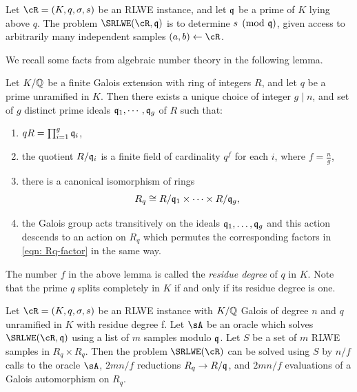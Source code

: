 \documentclass[envcountsect]{llncs}
\begin{document}

\begin{definition} \label{def: srlwe mod q}
        Let $\cR = (K,q,\sigma, s)$ be an RLWE instance, and let $\mathfrak{q}$ be a prime of $K$ lying above $q$.  The problem $\SRLWE(\cR, \fq)$ is to determine $s \pmod {\mathfrak{q}}$, given access to arbitrarily many independent samples $(a,b) \gets \cR$.
\end{definition}

We recall some facts from algebraic number theory in the following lemma.
\begin{lemma}
\label{lem: prime factorization}
Let $K/\mathbb{Q}$ be a finite Galois extension with ring of integers $R$,  and let $q$ be a prime unramified in $K$. Then there exists a unique choice of integer $g \mid n$, and set of $g$ distinct prime ideals $\mathfrak{q}_1, \cdots ,\mathfrak{q}_g$ of
$R$ such that:
\begin{enumerate}
        \item $qR = \prod_{i=1}^g \mathfrak{q}_i$,
        \item the quotient $R/\mathfrak{q}_{i}$ is a finite field of cardinality $q^f$  for each $i$, where $f = \frac{n}{g}$, 
        \item there is a canonical isomorphism of rings
                \begin{equation}
                        \label{eqn: Rq-factor}
    R_q \cong R/\mathfrak{q}_{1} \times \cdots \times R/\mathfrak{q}_{g},
    \end{equation}
\item the Galois group acts transitively on the ideals $\mathfrak{q}_1, \ldots, \mathfrak{q}_g$ and this action descends to an action on $R_q$ which permutes the corresponding factors in \eqref{eqn: Rq-factor} in the same way.
\end{enumerate}
\end{lemma}
The number $f$ in the above lemma is called the {\it residue degree} of $q$ in $K$. Note that the prime $q$ splits completely in $K$ if and only if its residue degree is one.


\begin{theorem} \label{thm: reduction}
        Let $\cR = (K,q,\sigma, s)$ be an RLWE instance with $K/\mathbb{Q}$ Galois of degree $n$ and $q$ unramified in $K$ with residue degree f. Let $\sA$ be an oracle which solves $\SRLWE(\cR,\fq)$ using a list of $m$ samples modulo $\mathfrak{q}$.  Let $S$ be a set of $m$ RLWE samples in $R_q \times R_q$.  Then the problem $\SRLWE(\cR)$ can be solved using $S$ by $n/f$ calls to the oracle $\sA$, $2mn/f$ reductions $R_q \rightarrow R/\mathfrak{q}$, and $2mn/f$ evaluations of a Galois automorphism on $R_q$.
\end{theorem}
\end{document}
